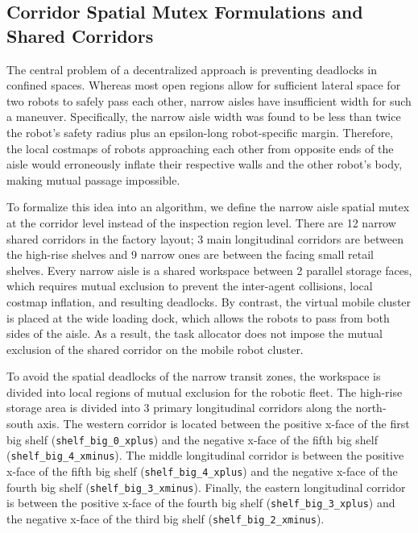 \subsection{Corridor Spatial Mutex Formulations and Shared Corridors}

The central problem of a decentralized approach is preventing deadlocks in confined spaces. Whereas most open regions allow for sufficient lateral space for two robots to safely pass each other, narrow aisles have insufficient width for such a maneuver. Specifically, the narrow aisle width was found to be less than twice the robot's safety radius plus an epsilon-long robot-specific margin. Therefore, the local costmaps of robots approaching each other from opposite ends of the aisle would erroneously inflate their respective walls and the other robot's body, making mutual passage impossible.

To formalize this idea into an algorithm, we define the narrow aisle spatial mutex at the corridor level instead of the inspection region level. There are 12 narrow shared corridors in the factory layout; 3 main longitudinal corridors are between the high-rise shelves and 9 narrow ones are between the facing small retail shelves. Every narrow aisle is a shared workspace between 2 parallel storage faces, which requires mutual exclusion to prevent the inter-agent collisions, local costmap inflation, and resulting deadlocks. By contrast, the virtual mobile cluster is placed at the wide loading dock, which allows the robots to pass from both sides of the aisle. As a result, the task allocator does not impose the mutual exclusion of the shared corridor on the mobile robot cluster.

To avoid the spatial deadlocks of the narrow transit zones, the workspace is divided into local regions of mutual exclusion for the robotic fleet. The high-rise storage area is divided into 3 primary longitudinal corridors along the north-south axis. The western corridor is located between the positive x-face of the first big shelf (\texttt{shelf\_big\_0\_xplus}) and the negative x-face of the fifth big shelf (\texttt{shelf\_big\_4\_xminus}). The middle longitudinal corridor is between the positive x-face of the fifth big shelf (\texttt{shelf\_big\_4\_xplus}) and the negative x-face of the fourth big shelf (\texttt{shelf\_big\_3\_xminus}). Finally, the eastern longitudinal corridor is between the positive x-face of the fourth big shelf (\texttt{shelf\_big\_3\_xplus}) and the negative x-face of the third big shelf (\texttt{shelf\_big\_2\_xminus}).

